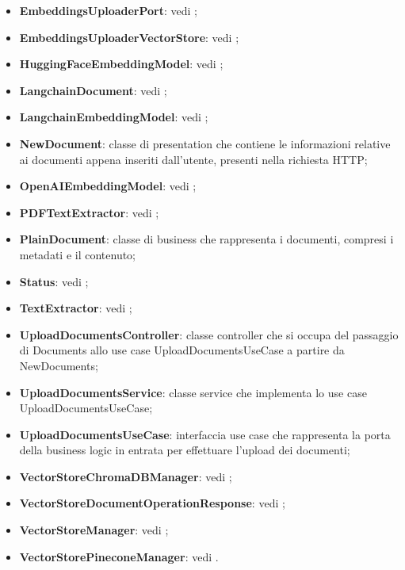 \documentclass[10pt, a4paper]{article}
\begin{document}
\begin{itemize}
    \item \textbf{EmbeddingsUploaderPort}: vedi ;
    \item \textbf{EmbeddingsUploaderVectorStore}: vedi ;
    \item \textbf{HuggingFaceEmbeddingModel}: vedi ;
    \item \textbf{LangchainDocument}: vedi ;
    \item \textbf{LangchainEmbeddingModel}: vedi ;
    \item \label{NewDocument}\textbf{NewDocument}: classe di presentation che contiene le informazioni relative ai documenti appena inseriti dall'utente, presenti nella richiesta HTTP;
    \item \textbf{OpenAIEmbeddingModel}: vedi ;
    \item \textbf{PDFTextExtractor}: vedi ;
    \item \label{PlainDocument}\textbf{PlainDocument}: classe di business che rappresenta i documenti, compresi i metadati e il contenuto;
    \item \textbf{Status}: vedi ;
    \item \textbf{TextExtractor}: vedi ;
    \item \label{UploadDocumentsController}\textbf{UploadDocumentsController}: classe controller che si occupa del passaggio di Documents allo use case UploadDocumentsUseCase a partire da NewDocuments;
    \item \label{UploadDocumentsService}\textbf{UploadDocumentsService}: classe service che implementa lo use case UploadDocumentsUseCase;
    \item \label{UploadDocumentsUseCase}\textbf{UploadDocumentsUseCase}: interfaccia use case che rappresenta la porta della business logic in entrata per effettuare l'upload dei documenti;
    \item \textbf{VectorStoreChromaDBManager}: vedi ;
    \item \textbf{VectorStoreDocumentOperationResponse}: vedi ;
    \item \textbf{VectorStoreManager}: vedi ;
    \item \textbf{VectorStorePineconeManager}: vedi .
    
\end{itemize}
\end{document}

